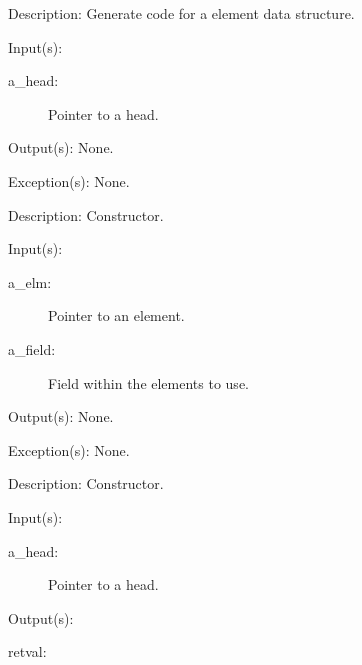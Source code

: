 \begin{capi}
\begin{capilist}
	\item[Description: ]
		Generate code for a  element data structure.
	\end{capilist}
\label{ql_new}
	\begin{capilist}
	\item[Input(s): ]
		\begin{description}\item[]
		\item[a\_head: ]
			Pointer to a  head.
		\end{description}
	\item[Output(s): ] None.
	\item[Exception(s): ] None.
	\item[Description: ]
		Constructor.
	\end{capilist}
\label{ql_elm_new}
	\begin{capilist}
	\item[Input(s): ]
		\begin{description}\item[]
		\item[a\_elm: ]
			Pointer to an element.
		\item[a\_field: ]
			Field within the  elements to use.
		\end{description}
	\item[Output(s): ] None.
	\item[Exception(s): ] None.
	\item[Description: ]
		Constructor.
	\end{capilist}
\label{ql_first}
	\begin{capilist}
	\item[Input(s): ]
		\begin{description}\item[]
		\item[a\_head: ]
			Pointer to a \classname{ql} head.
		\end{description}
	\item[Output(s): ]
		\begin{description}\item[]
		\item[retval: ]
			\begin{description}\item[]

\end{description}
\end{description}
\end{capilist}
\end{capi}
